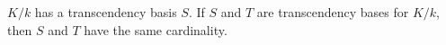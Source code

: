 $K/k$ has a transcendency basis $S$. If $S$ and $T$ are transcendency bases for $K/k$, then $S$ and $T$ have the same cardinality.
